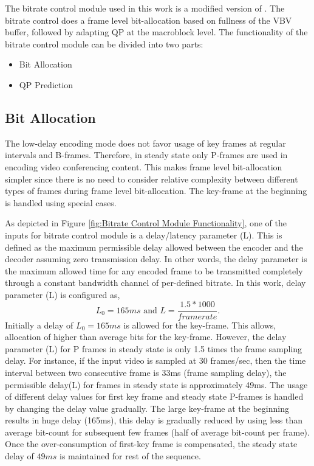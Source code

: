 \documentclass[11pt]{article} %
\begin{document}
 The bitrate control module used in this work is a modified version of \cite{JVTF086}.  The bitrate control does a frame level bit-allocation based on fullness of the VBV buffer, followed by adapting QP at the macroblock level. The functionality of the bitrate control module can be divided into two parts:
\begin{itemize}  
\item Bit Allocation
\item QP Prediction
\end{itemize}

\subsection{Bit Allocation} \label{used-bit-allocation-overview}

The low-delay encoding mode does not favor usage of key frames at regular intervals and B-frames. Therefore, in steady state only P-frames are used in encoding video conferencing content. This makes frame level bit-allocation simpler since there is no need to consider relative complexity between different types of frames during frame level bit-allocation. The key-frame at the beginning is handled using special cases.  

As depicted in Figure \ref{fig:Bitrate Control Module Functionality}, one of the inputs for bitrate control module is a delay/latency parameter (L). This is defined as the maximum permissible delay allowed between the encoder and the decoder assuming zero transmission delay. In other words, the delay parameter is the maximum allowed time for any encoded frame to be transmitted completely through a constant bandwidth channel of per-defined bitrate. In this work, delay parameter (L) is configured as,
\begin{equation} 
	L_0 = 165 ms \text{	and	} L = \frac{1.5 * 1000}{framerate}.
\end{equation}
Initially a delay of $L_0 = 165ms$ is allowed for the key-frame. This allows, allocation of higher than average bits for the key-frame. However, the delay parameter (L) for P frames in steady state is only 1.5 times the frame sampling delay. For instance, if the input video is sampled at 30 frames/sec, then the time interval between two consecutive frame is 33ms (frame sampling delay), the permissible delay(L) for frames in steady state is approximately 49ms. The usage of different delay values for first key frame and steady state P-frames is handled by changing the delay value gradually. The large key-frame at the beginning results in huge delay (165ms), this delay is gradually reduced by using less than average bit-count for subsequent few frames (half of average bit-count per frame). Once the over-consumption of first-key frame is compensated, the steady state delay of $49ms$ is maintained for rest of the sequence.
\end{document}
